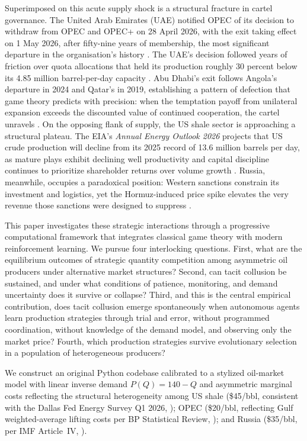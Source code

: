 Superimposed on this acute supply shock is a structural fracture in
cartel governance. The United Arab Emirates (UAE) notified OPEC of its
decision to withdraw from OPEC and OPEC+ on 28 April 2026, with the exit
taking effect on 1 May 2026, after fifty-nine years of membership, the
most significant departure in the organisation's history
\citep{emirates2026}. The UAE's decision followed years of
friction over quota allocations that held its production roughly
30 percent below its 4.85 million barrel-per-day capacity
\citep{woodmac2026}. Abu Dhabi's exit follows Angola's departure in 2024
and Qatar's in 2019, establishing a pattern of defection that game theory
predicts with precision: when the temptation payoff from unilateral
expansion exceeds the discounted value of continued cooperation, the
cartel unravels \citep{fudenbergmaskin1986}. On the opposing flank of
supply, the US shale sector is approaching a structural plateau. The
EIA's \emph{Annual Energy Outlook 2026} projects that US crude
production will decline from its 2025 record of 13.6 million barrels per
day, as mature plays exhibit declining well productivity and capital
discipline continues to prioritize shareholder returns over volume
growth \citep{eia2026aep,dallasfed2026}. Russia, meanwhile, occupies a
paradoxical position: Western sanctions constrain its investment and
logistics, yet the Hormuz-induced price spike elevates the very revenue
those sanctions were designed to suppress \citep{ft2026}.

This paper investigates these strategic interactions through a
progressive computational framework that integrates classical game
theory with modern reinforcement learning. We pursue four interlocking
questions. First, what are the equilibrium outcomes of strategic
quantity competition among asymmetric oil producers under alternative
market structures? Second, can tacit collusion be sustained, and under
what conditions of patience, monitoring, and demand uncertainty does it
survive or collapse? Third, and this is the central empirical
contribution, does tacit collusion emerge spontaneously when autonomous
agents learn production strategies through trial and error, without
programmed coordination, without knowledge of the demand model, and
observing only the market price? Fourth, which production strategies
survive evolutionary selection in a population of heterogeneous
producers?

We construct an original Python codebase calibrated to a stylized
oil-market model with linear inverse demand $P(Q) = 140 - Q$ and
asymmetric marginal costs reflecting the structural heterogeneity among
US shale (\$45/bbl, consistent with the Dallas Fed Energy Survey
Q1 2026, \citealp{dallasfed2026}); OPEC (\$20/bbl, reflecting Gulf
weighted-average lifting costs per BP Statistical Review,
\citealp{bp2022}); and Russia (\$35/bbl, per IMF Article~IV,
\citealp{imf2021}).

